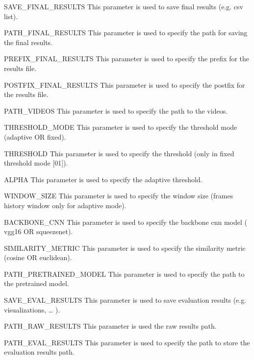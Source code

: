 \documentclass[letterpaper,10pt,english,openany,oneside]{sphinxmanual}
\begin{document}
SAVE\_FINAL\_RESULTS
This parameter is used to save final results (e.g. csv list).



PATH\_FINAL\_RESULTS
This parameter is used to specify the path for saving the final results.



PREFIX\_FINAL\_RESULTS
This parameter is used to specify the prefix for the results file.



POSTFIX\_FINAL\_RESULTS
This parameter is used to specify the postfix for the results file.



PATH\_VIDEOS
This parameter is used to specify the path to the videos.



THRESHOLD\_MODE
This parameter is used to specify the threshold mode (adaptive OR fixed).



THRESHOLD
This parameter is used to specify the threshold (only in fixed threshold mode \sphinxhyphen{} {[}0\sphinxhyphen{}1{]}).



ALPHA
This parameter is used to specify the adaptive threshold.



WINDOW\_SIZE
This parameter is used to specify the window size (frames history window \sphinxhyphen{} only for adaptive mode).



BACKBONE\_CNN
This parameter is used to specify the backbone cnn model ( vgg16 OR squeezenet).



SIMILARITY\_METRIC
This parameter is used to specify the similarity metric (cosine OR euclidean).



PATH\_PRETRAINED\_MODEL
This parameter is used to specify the path to the pre\sphinxhyphen{}trained model.



SAVE\_EVAL\_RESULTS
This parameter is used to save evaluation results (e.g. visualizations, … ).



PATH\_RAW\_RESULTS
This parameter is used the raw results path.



PATH\_EVAL\_RESULTS
This parameter is used to specify the path to store the evaluation results path.
\end{document}
